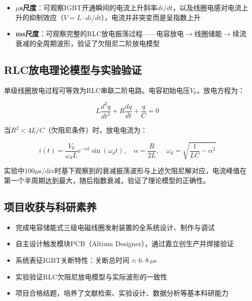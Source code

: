 \documentclass[12pt,a4paper]{ctexart}
\begin{document}
\begin{itemize}
    \item \textbf{$\mu$s尺度}：可观察IGBT开通瞬间的电流上升斜率$di/dt$，以及线圈电感对电流上升的抑制效应（$V = L \cdot di/dt$），电流并非突变而是呈指数上升
    \item \textbf{ms尺度}：可观察完整的RLC放电振荡过程——电容放电$\to$线圈储能$\to$续流衰减的全周期波形，验证了欠阻尼二阶放电模型
\end{itemize}

\subsection{RLC放电理论模型与实验验证}

单级线圈放电过程可等效为RLC串联二阶电路。电容初始电压$V_0$，放电方程为：

\[
L\frac{d^2q}{dt^2} + R\frac{dq}{dt} + \frac{q}{C} = 0
\]

当$R^2 < 4L/C$（欠阻尼条件）时，放电电流为：

\[
i(t) = \frac{V_0}{\omega_d L} e^{-\alpha t} \sin(\omega_d t), \quad \alpha = \frac{R}{2L}, \quad \omega_d = \sqrt{\frac{1}{LC} - \alpha^2}
\]

实验中100$\mu$s/div时基下观察到的衰减振荡波形与上述欠阻尼解对应，电流峰值在第一个半周期达到最大，随后指数衰减，验证了理论模型的正确性。

\subsection{项目收获与科研素养}

\begin{resultbox}[项目成果]
\begin{itemize}
    \item 完成电容储能式三级电磁线圈发射装置的全系统设计、制作与调试
    \item 自主设计触发模块PCB（Altium Designer），通过嘉立创生产并焊接验证
    \item 系统表征IGBT关断特性：关断总时间$\approx 6$--$8\,\mu$s
    \item 实验验证RLC欠阻尼放电模型与实际波形的一致性
    \item 项目合格结题，培养了文献检索、实验设计、数据分析等基本科研能力
\end{itemize}
\end{resultbox}

\newpage
\end{document}
